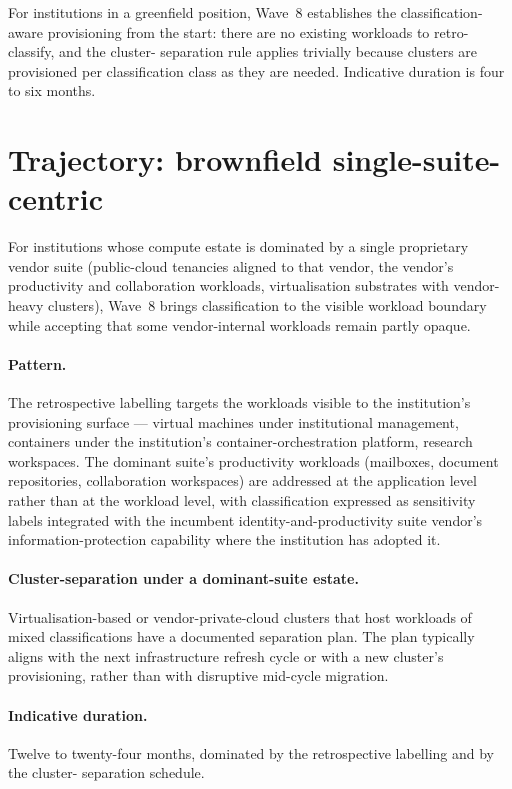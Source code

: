 For institutions in a greenfield position, Wave~8 establishes
the classification-aware provisioning from the start: there are
no existing workloads to retro-classify, and the cluster-
separation rule applies trivially because clusters are
provisioned per classification class as they are needed.
Indicative duration is four to six months.

\section{Trajectory: brownfield single-suite-centric}
\label{sec:w8-brownfield-ms}

For institutions whose compute estate is dominated by a single
proprietary vendor suite (public-cloud tenancies aligned to that
vendor, the vendor's productivity and collaboration workloads,
virtualisation substrates with vendor-heavy clusters), Wave~8
brings classification to the visible workload boundary while
accepting that some vendor-internal workloads remain partly
opaque.

\paragraph{Pattern.} The retrospective labelling targets the
workloads visible to the institution's provisioning surface ---
virtual machines under institutional management, containers
under the institution's container-orchestration platform,
research workspaces. The dominant suite's productivity workloads
(mailboxes, document repositories, collaboration workspaces) are
addressed at the application level rather than at the workload
level, with classification expressed as sensitivity labels
integrated with the incumbent identity-and-productivity suite
vendor's information-protection capability where the institution
has adopted it.

\paragraph{Cluster-separation under a dominant-suite estate.}
Virtualisation-based or vendor-private-cloud clusters that host
workloads of mixed classifications have a documented separation
plan. The plan typically aligns with the next infrastructure
refresh cycle or with a new cluster's provisioning, rather than
with disruptive mid-cycle migration.

\paragraph{Indicative duration.} Twelve to twenty-four months,
dominated by the retrospective labelling and by the cluster-
separation schedule.

